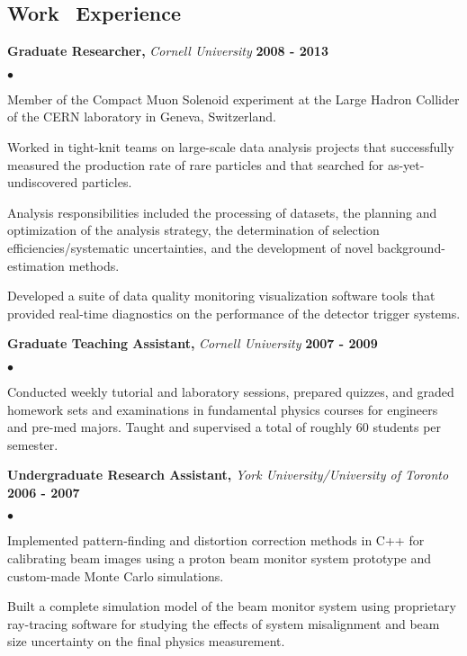 \documentclass[margin,line]{res}
\newenvironment{list2}{
  \begin{list}{$\bullet$}{%
      \setlength{\itemsep}{0in}
      \setlength{\parsep}{0in} \setlength{\parskip}{0in}
      \setlength{\topsep}{0in} \setlength{\partopsep}{0in} 
      \setlength{\leftmargin}{0.2in}}}{\end{list}}
\begin{document}
\begin{resume}
\section{\sc Work \,\,\,Experience}
{\bf Graduate Researcher,}
{\em Cornell University} \hfill {\bf 2008 - 2013}\\
\vspace*{-2mm}
\begin{list2}
\item Member of the Compact Muon Solenoid experiment at the Large
  Hadron Collider of the CERN laboratory in Geneva, Switzerland.
\item Worked in tight-knit teams on large-scale data analysis projects
  that successfully measured the production rate of rare particles and
  that searched for as-yet-undiscovered particles.
\item Analysis responsibilities included the processing of datasets,
  the planning and optimization of the analysis strategy, the
  determination of selection efficiencies/systematic uncertainties,
  and the development of novel background-estimation methods.
\item Developed a suite of data quality monitoring visualization
  software tools that provided real-time diagnostics on the performance
  of the detector trigger systems.
\end{list2}


{\bf Graduate Teaching Assistant,}
{\em Cornell University} \hfill {\bf 2007 - 2009}\\
\vspace*{-2mm}
\begin{list2}
\item Conducted weekly tutorial and laboratory sessions, prepared
  quizzes, and graded homework sets and examinations in fundamental
  physics courses for engineers and pre-med majors.  Taught and
  supervised a total of roughly 60 students per semester.
\end{list2}

{\bf Undergraduate Research Assistant,}
{\em York University/University of Toronto} \hfill {\bf 2006 - 2007}\\
\vspace*{-2mm}
\begin{list2}
\item Implemented pattern-finding and distortion correction methods in
  C++ for calibrating beam images using a proton beam monitor system
  prototype and custom-made Monte Carlo simulations.
\item Built a complete simulation model of the beam monitor system
  using proprietary ray-tracing software for studying the effects of
  system misalignment and beam size uncertainty on the final physics
  measurement.
\end{list2}



\end{resume}
\end{document}
